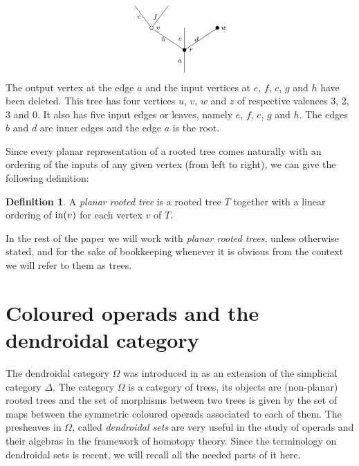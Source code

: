 \documentclass[a4paper]{amsart}
\theoremstyle{plain}
\theoremstyle{definition}
\newtheorem{dfn}[thm]{Definition}
\theoremstyle{remark}
\numberwithin{equation}{section}
\numberwithin{figure}{section}
\begin{document}
\begin{equation}
    \xy
        <0.08cm, 0cm>:
        (0.0, 0.0)*{}="1"; %
        (0.0, 10.0)*=0{\bullet}="2"; %
        (-15.0, 20.0)*{\circ}="3"; %
        (-22.5, 30.0)*{}="4"; %
        (-7.5, 30.0)*{}="5"; %
        (0.0, 20.0)*{}="6"; %
        (15.0, 20.0)*=0{\bullet}="7"; %
        "1";"2" **\dir{-};
        "2";"3" **\dir{-};
        "3";"4" **\dir{-};
        "3";"5" **\dir{-};
        "2";"6" **\dir{-};
        "2";"7" **\dir{-};
        (3.0, 10.0)*=0{\scriptstyle r};
        (-12.0, 20.0)*=0{\scriptstyle v};
        (18.0, 20.0)*=0{\scriptstyle w};
        (-2.0, 5.0)*=0{\scriptstyle a};
        (-9.5, 15.0)*=0{\scriptstyle b};
        (-20.75, 25.0)*=0{\scriptstyle e};
        (-13.25, 25.0)*=0{\scriptstyle f};
        (-2.0, 15.0)*=0{\scriptstyle c};
        (5.5, 15.0)*=0{\scriptstyle d};
    \endxy
\end{equation}
The output vertex at the edge $a$ and the input vertices at $e$, $f$, $c$, $g$ and $h$ have been deleted.
This tree has four vertices $u$, $v$, $w$ and $z$ of respective valences 3, 2, 3 and 0. It also has five input
edges or leaves, namely $e$, $f$, $c$, $g$ and $h$. The edges $b$ and $d$ are inner edges and the edge $a$ is the root.

Since every planar representation of a rooted tree
comes naturally with an ordering of the inputs of any given vertex
(from left to right), we can give the following definition:

\begin{dfn}
    A \emph{planar rooted tree} is a rooted tree $T$ together with a linear ordering of
    $\operatorname{in}(v)$ for each vertex $v$ of $T$.
\end{dfn}

In the rest of the paper we will work with \emph{planar rooted trees}, unless otherwise stated, and for the sake of
bookkeeping whenever it is obvious from the context we will refer to them as trees.

\section{Coloured operads and the dendroidal category}
The dendroidal category $\Omega$ was introduced in \cite{Wei07,
    moerdijkweiss} as an extension of the simplicial category $\Delta$.
The category $\Omega$ is a category of trees, its objects are
(non-planar) rooted trees and the set of morphisms between two trees
is given by the set of maps between the symmetric coloured operads
associated to each of them. The presheaves in $\Omega$, called
\emph{dendroidal sets} are very useful in the study of operads and
their algebras in the framework of homotopy theory. Since the
terminology on dendroidal sets is  recent, we will recall all the
needed parts of it here.
\end{document}

